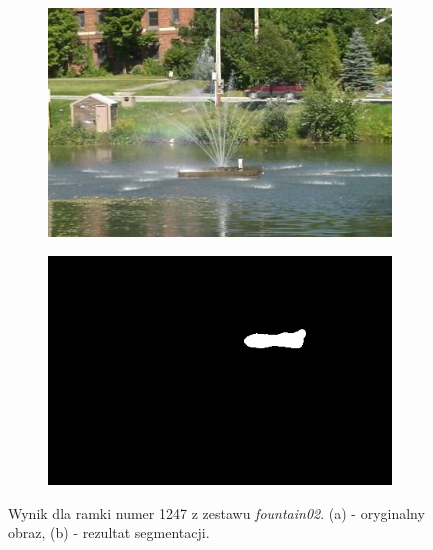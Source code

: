 \begin{figure}[!h]
\centering
\begin{subfigure}[b]{0.4\textwidth}
\includegraphics[width=\textwidth]{img/subsenseIn}
\caption{}
\end{subfigure}
\quad
\begin{subfigure}[b]{0.4\textwidth}
\includegraphics[width=\textwidth]{img/subsenseOut}
\caption{}
\end{subfigure}
\caption{Wynik dla ramki numer 1247 z zestawu \textit{fountain02}. (a) - oryginalny obraz, (b) - rezultat segmentacji.\label{fig:subsense}}
\end{figure}


